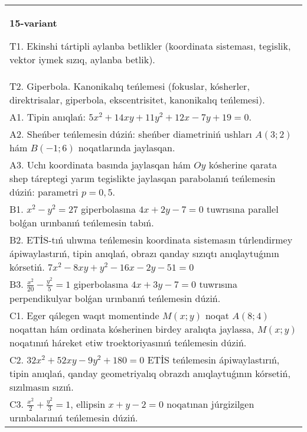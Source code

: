 \documentclass{article}
\begin{document}
\begin{tabular}{m{17cm}}
\textbf{15-variant}
\newline

T1. Ekinshi tártipli aylanba betlikler (koordinata sisteması, tegislik, vektor iymek sızıq, aylanba betlik).\\

T2. Giperbola. Kanonikalıq teńlemesi (fokuslar, kósherler, direktrisalar, giperbola, ekscentrisitet, kanonikalıq teńlemesi).\\

A1. Tipin anıqlań: $5 x^{2}+14 xy+11 y^{2}+12 x-7 y+19=0$.\\

A2. Sheńber teńlemesin dúziń: sheńber diametriniń ushları $A (3;2) $ hám $B (-1;6 ) $ noqatlarında jaylasqan.\\

A3. Uchı koordinata basında jaylasqan hám $Oy$ kósherine qarata shep táreptegi yarım tegislikte jaylasqan parabolanıń teńlemesin dúziń: parametri $p=0,5$.\\

B1. $x^{2} - y^{2} = 27$ giperbolasına $4x + 2y - 7 = 0$ tuwrısına parallel bolǵan urınbanıń teńlemesin tabıń.  \\

B2. ETİS-tıń ulıwma teńlemesin koordinata sistemasın túrlendirmey ápiwaylastırıń, tipin anıqlań, obrazı qanday sızıqtı anıqlaytuǵının kórsetiń. $7x^{2} - 8xy + y^{2} - 16x - 2y - 51 = 0$  \\

B3. $\frac{x^{2}}{20} - \frac{y^{2}}{5} = 1$ giperbolasına $4x + 3y - 7 = 0$ tuwrısına perpendikulyar bolǵan urınbanıń teńlemesin dúziń.  \\

C1. Eger qálegen waqıt momentinde $M(x;y)$ noqat $A(8;4)$ noqattan hám ordinata kósherinen birdey aralıqta jaylassa, $M(x;y)$ noqatınıń háreket etiw troektoriyasınıń teńlemesin dúziń.  \\

C2. $32x^{2} + 52xy - 9y^{2} + 180 = 0$ ETİS teńlemesin ápiwaylastırıń, tipin anıqlań, qanday geometriyalıq obrazdı anıqlaytuǵının kórsetiń, sızılmasın sızıń.  \\

C3. $\frac{x^{2}}{2} + \frac{y^{2}}{3} = 1$, ellipsin $x + y - 2 = 0$ noqatınan júrgizilgen urınbalarınıń teńlemesin dúziń.  \\

\end{tabular}
\vspace{1cm}
\end{document}
